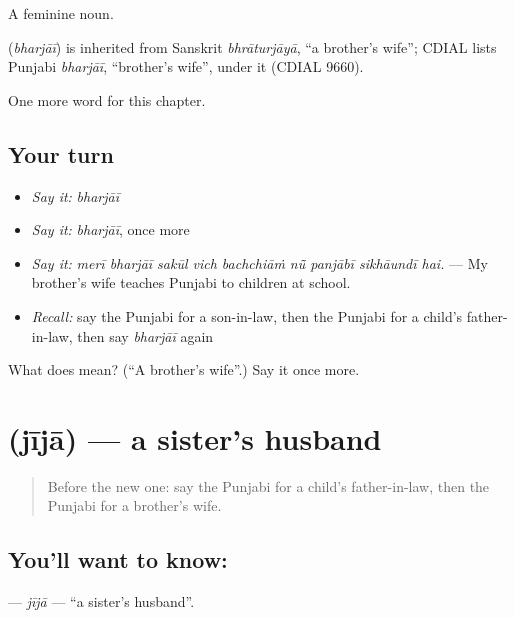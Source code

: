 A feminine noun.

\begin{cousinweb}
\textbf{} (\emph{bharjāī}) is inherited from Sanskrit \emph{bhrāturjāyā}, \textquotedblleft{}a brother's wife\textquotedblright{}; CDIAL lists Punjabi \emph{bharjāī}, \textquotedblleft{}brother's wife\textquotedblright{}, under it (CDIAL 9660).
\end{cousinweb}

\begin{grammarlens}[title={What you've built}]
One more word for this chapter.
\end{grammarlens}

\subsection*{Your turn}
\begin{itemize}
\raggedright
  \item \emph{Say it:} \emph{bharjāī}
  \item \emph{Say it:} \emph{bharjāī}, once more
  \item \emph{Say it:} \emph{merī bharjāī sakūl vich bachchiāṁ nū̃ panjābī sikhāundī hai.} — My brother's wife teaches Punjabi to children at school.
  \item \emph{Recall:} say the Punjabi for a son-in-law, then the Punjabi for a child's father-in-law, then say \emph{bharjāī} again
\end{itemize}

\begin{tcolorbox}[breakable,colback=teal!4,colframe=teal!35!black,title={Before you move on}]
What does  mean? (\textquotedblleft{}A brother's wife\textquotedblright{}.) Say it once more.
\end{tcolorbox}
\section[\texorpdfstring{\pa{ਜੀਜਾ} (jījā)}{ਜੀਜਾ (jījā)}]{ (jījā) — a sister's husband}

\label{lesson:PA-C330-jija}



\begin{quote}
Before the new one: say the Punjabi for a child's father-in-law, then the Punjabi for a brother's wife.
\end{quote}

\subsection*{You'll want to know: }
\textbf{} — \emph{jījā} — \textquotedblleft{}a sister's husband\textquotedblright{}.

